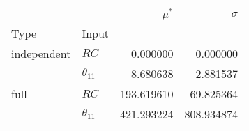 \begin{tabular}{llrr}
\toprule
     &               &  $\mu^\ast$ &    $\sigma$ \\
Type & Input &             &             \\
\midrule
independent & $RC$ &    0.000000 &    0.000000 \\
     & $\theta_{11}$ &    8.680638 &    2.881537 \\
full & $RC$ &  193.619610 &   69.825364 \\
     & $\theta_{11}$ &  421.293224 &  808.934874 \\
\bottomrule
\end{tabular}
